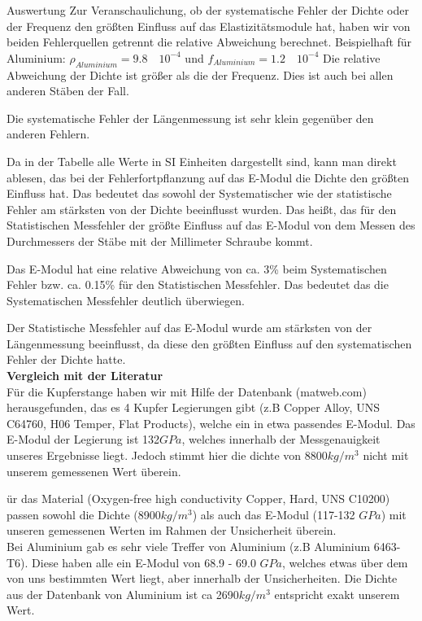 \documentclass[twoside]{protokoll}
\begin{document}
\begin{aufgabe}{Auswertung}
Zur Veranschaulichung, ob der systematische Fehler der Dichte oder der Frequenz den größten Einfluss auf das Elastizitätsmodule hat, haben wir von beiden Fehlerquellen getrennt die relative Abweichung berechnet.
Beispielhaft für Aluminium:
$ \rho_{Aluminium} = 9.8 \quad 10^{-4} $ und $ f_{Aluminium} = 1.2 \quad 10^{-4} $
Die relative Abweichung der Dichte ist größer als die der Frequenz. Dies ist auch bei allen anderen Stäben der Fall.

Die systematische Fehler der Längenmessung ist sehr klein gegenüber den anderen Fehlern.

Da in der Tabelle alle Werte in SI Einheiten dargestellt sind, kann man direkt ablesen,
das bei der Fehlerfortpflanzung auf das E-Modul die Dichte den größten Einfluss hat. 
Das bedeutet das sowohl der Systematischer wie der statistische Fehler am stärksten von der Dichte beeinflusst wurden.
Das heißt, das für den Statistischen Messfehler der größte Einfluss auf das E-Modul von dem Messen des Durchmessers der Stäbe mit der Millimeter Schraube kommt.
 
Das E-Modul hat eine relative Abweichung von ca. 3\% beim Systematischen Fehler bzw. ca. 0.15\% für den Statistischen Messfehler.
Das bedeutet das die Systematischen Messfehler deutlich überwiegen.
 
Der Statistische Messfehler auf das E-Modul wurde am stärksten von der Längenmessung beeinflusst, da diese den größten Einfluss auf den systematischen Fehler der Dichte hatte. \\
 
\textbf{Vergleich mit der Literatur} \\
Für die Kupferstange haben wir mit Hilfe der Datenbank (matweb.com) herausgefunden, das es 4 Kupfer Legierungen gibt (z.B Copper Alloy, UNS C64760, H06 Temper, Flat Products), welche ein in etwa passendes E-Modul.
Das E-Modul der Legierung ist 132$GPa$, welches innerhalb der Messgenauigkeit unseres Ergebnisse liegt.
Jedoch stimmt hier die dichte von 8800$kg/m^3$ nicht mit unserem gemessenen Wert überein.
 
ür das Material (Oxygen-free high conductivity Copper, Hard, UNS C10200) passen sowohl die Dichte (8900$kg/m^3$) als auch das E-Modul (117-132 $GPa$) mit unseren gemessenen Werten im Rahmen der Unsicherheit überein. \\
 
Bei Aluminium gab es sehr viele Treffer von Aluminium (z.B Aluminium 6463-T6).
Diese haben alle ein E-Modul von 68.9 - 69.0 $GPa$, welches etwas über dem von uns bestimmten Wert liegt, aber innerhalb der Unsicherheiten.
Die Dichte aus der Datenbank von Aluminium ist ca 2690$kg/m^3$ entspricht exakt unserem Wert. \\
 

\end{aufgabe}
\end{document}
